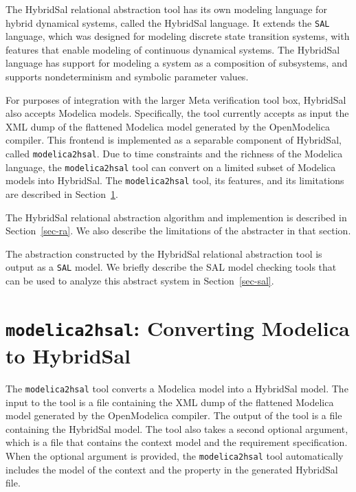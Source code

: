 \documentclass{llncs}
\begin{document}
The HybridSal relational abstraction tool has its own modeling 
language for hybrid dynamical systems, called the HybridSal language.
It extends the {\tt{SAL}} language, which was designed for modeling discrete state 
transition systems, with features that enable modeling of continuous
dynamical systems.  The HybridSal language has support for modeling
a system as a composition of subsystems, and supports nondeterminism
and symbolic parameter values.

For purposes of integration with the larger Meta verification tool box,
HybridSal also accepts Modelica models.
Specifically, the tool currently accepts as input the XML dump of the
flattened Modelica model generated by the OpenModelica compiler.
This frontend is implemented as a separable component of HybridSal,
called {\tt{modelica2hsal}}.
Due to time constraints and the richness of the Modelica language,
the {\tt{modelica2hsal}} tool can convert on a
limited subset of Modelica models into HybridSal.  
The {\tt{modelica2hsal}} tool, its features, and its limitations
are described in Section~\ref{sec-modelica2hsal}.

The HybridSal relational abstraction algorithm and implemention is
described in Section~\ref{sec-ra}.  We also describe the limitations
of the abstracter in that section.

The abstraction constructed by the HybridSal relational abstraction tool
is output as a {\tt{SAL}} model.  We briefly describe the SAL model
checking tools that can be used to analyze this abstract system 
in Section~\ref{sec-sal}.

\section{{\tt{modelica2hsal}}: Converting Modelica to HybridSal}
\label{sec-modelica2hsal}

The {\tt{modelica2hsal}} tool converts a Modelica model into a HybridSal model.
The input to the tool is a file containing the XML dump of the
flattened Modelica model generated by the OpenModelica compiler.
The output of the tool is a file containing the HybridSal model.
The tool also takes a second optional argument, which is a file that contains
the context model and the requirement specification.
When the optional argument is provided, the {\tt{modelica2hsal}} tool automatically
includes the model of the context and the property in the generated HybridSal file.
\end{document}
